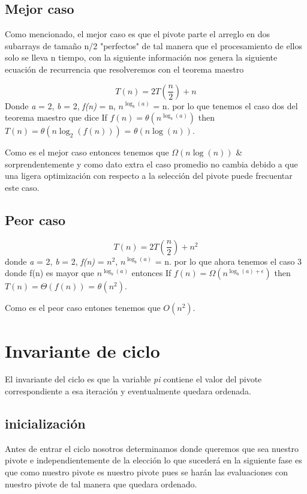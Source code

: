 \documentclass{article}
\begin{document}
\subsection*{Mejor caso}
  Como mencionado, el mejor caso es que el pivote parte el arreglo en dos subarrays de tamaño n/2 "perfectos" de tal manera que el 
  procesamiento de ellos solo se lleva n tiempo, con la siguiente información nos genera la siguiente ecuación de recurrencia que resolveremos con el teorema maestro

  \begin{equation*}
    T(n) = 2T(\frac{n}{2}) + n
  \end{equation*}
  Donde \textit{a} = 2, \textit{b} = 2, \textit{f(n)} = n, \textit{$n^{\log_b(a)}$} = n.
  por lo que tenemos el caso dos del teorema maestro que dice 
  If $f(n) = \theta(n^{\log_b(a)})$ then $T(n) = \theta(n\log_2(f(n)))$ = $\theta(n\log(n))$.

  Como es el mejor caso entonces tenemos que $\Omega(n\log(n))$ \& sorprendentemente y como dato extra el caso promedio no cambia debido a que una ligera optimización
  con respecto a la selección del pivote puede frecuentar este caso.


\subsection*{Peor caso}
\begin{equation*}
    T(n) = 2T(\frac{n}{2}) + n^2
  \end{equation*}
  donde \textit{a} = 2, \textit{b} = 2, \textit{f(n)} = $n^2$, \textit{$n^{\log_b(a)}$} = n.
  por lo que ahora tenemos el caso 3 donde f(n) es mayor que \textit{$n^{\log_b(a)}$} entonces
  If $f(n) = \Omega(n^{\log_b(a) + \epsilon})$ then $T(n) = \Theta(f(n))$ = $\theta(n^2)$.

  Como es el peor caso entones tenemos que $O(n^2)$.

\section{Invariante de ciclo}\label{Idc}
El invariante del ciclo es que la variable \textit{pi} contiene el valor del pivote correspondiente a esa iteración y eventualmente quedara ordenada.
\subsection*{inicialización}
Antes de entrar el ciclo nosotros determinamos donde queremos que sea nuestro pivote e independientemente de la elección lo que sucederá en la siguiente fase es que como nuestro pivote es nuestro pivote
pues se harán las evaluaciones con nuestro pivote de tal manera que quedara ordenado.  
\end{document}
